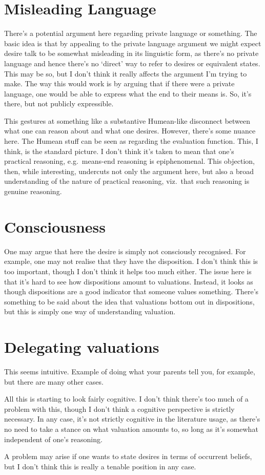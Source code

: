\documentclass[10pt]{article}
\begin{document}
\newpage

\section{Misleading Language}
\label{sec:misleading-language}

There's a potential argument here regarding private language or something.
The basic idea is that by appealing to the private language argument we might expect desire talk to be somewhat misleading in its linguistic form, as there's no private language and hence there's no `direct' way to refer to desires or equivalent states.
This may be so, but I don't think it really affects the argument I'm trying to make.
The way this would work is by arguing that if there were a private language, one would be able to express what the end to their means is.
So, it's there, but not publicly expressible.

This gestures at something like a substantive Humean-like disconnect between what one can reason about and what one desires.
However, there's some nuance here.
The Humean stuff can be seen as regarding the evaluation function.
This, I think, is the standard picture.
I don't think it's taken to mean that one's practical reasoning, e.g.\ means-end reasoning is epiphenomenal.
This objection, then, while interesting, undercuts not only the argument here, but also a broad understanding of the nature of practical reasoning, viz.\ that such reasoning is genuine reasoning.

\section{Consciousness}
\label{sec:consciousness}

One may argue that here the desire is simply not consciously recognised.
For example, one may not realise that they have the disposition.
I don't think this is too important, though I don't think it helps too much either.
The issue here is that it's hard to see how dispositions amount to valuations.
Instead, it looks as though dispositions are a good indicator that someone values something.
There's something to be said about the idea that valuations bottom out in dispositions, but this is simply one way of understanding valuation.

\section{Delegating valuations}
\label{sec:deleg-valu}

This seems intuitive.
Example of doing what your parents tell you, for example, but there are many other cases.

All this is starting to look fairly cognitive.
I don't think there's too much of a problem with this, though I don't think a cognitive perspective is strictly necessary.
In any case, it's not strictly cognitive in the literature usage, as there's no need to take a stance on what valuation amounts to, so long as it's somewhat independent of one's reasoning.

A problem may arise if one wants to state desires in terms of occurrent beliefs, but I don't think this is really a tenable position in any case.
\end{document}

